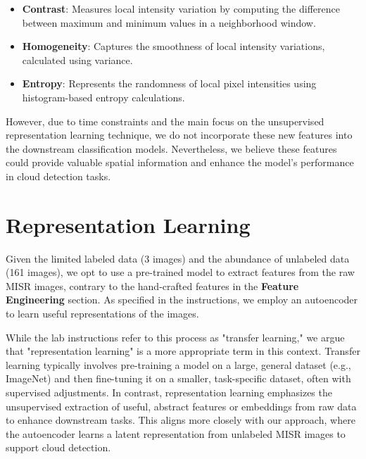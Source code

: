 \documentclass[10pt,letterpaper]{article}
\begin{document}
\begin{itemize}
    \item \textbf{Contrast}: Measures local intensity variation by computing the difference between maximum and minimum values in a neighborhood window.
    \item \textbf{Homogeneity}: Captures the smoothness of local intensity variations, calculated using variance.
    \item \textbf{Entropy}: Represents the randomness of local pixel intensities using histogram-based entropy calculations.
\end{itemize}

However, due to time constraints and the main focus on the unsupervised representation learning technique, we do not incorporate these new features into the downstream classification models. Nevertheless, we believe these features could provide valuable spatial information and enhance the model's performance in cloud detection tasks.

\section{Representation Learning}



Given the limited labeled data (3 images) and the abundance of unlabeled data (161 images), we opt to use a pre-trained model to extract features from the raw MISR images, contrary to the hand-crafted features in the \textbf{Feature Engineering} section. As specified in the instructions, we employ an autoencoder to learn useful representations of the images.

While the lab instructions refer to this process as "transfer learning," we argue that "representation learning" is a more appropriate term in this context. Transfer learning typically involves pre-training a model on a large, general dataset (e.g., ImageNet) and then fine-tuning it on a smaller, task-specific dataset, often with supervised adjustments. In contrast, representation learning emphasizes the unsupervised extraction of useful, abstract features or embeddings from raw data to enhance downstream tasks. This aligns more closely with our approach, where the autoencoder learns a latent representation from unlabeled MISR images to support cloud detection.
\end{document}
